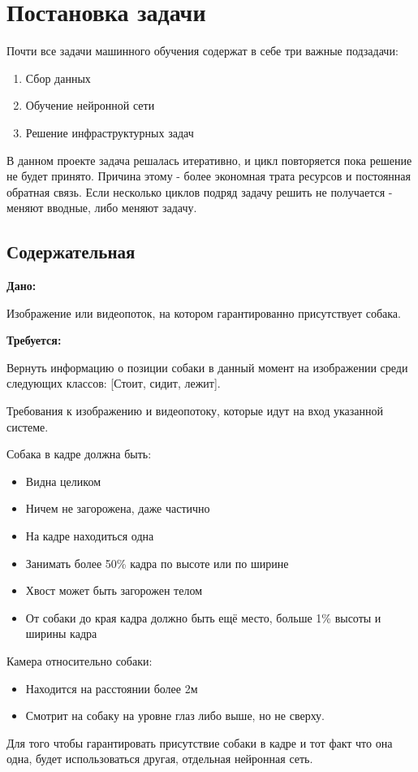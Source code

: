 \chapter{Постановка задачи} \label{chapt2}

Почти все задачи машинного обучения содержат в себе три важные подзадачи:
\begin{enumerate}
    \item Сбор данных
    \item Обучение нейронной сети
    \item Решение инфраструктурных задач
\end{enumerate}

В данном проекте задача решалась итеративно, и цикл повторяется пока решение не будет принято. Причина этому - более экономная трата ресурсов и постоянная обратная связь. Если несколько циклов подряд задачу решить не получается - меняют вводные, либо меняют задачу. 

\section{Содержательная} \label{sect2_1}
\textbf{Дано: } 

Изображение или видеопоток, на котором гарантированно присутствует собака.

\textbf{Требуется: } 

Вернуть информацию о позиции собаки в данный момент на изображении среди следующих классов: [Стоит, сидит, лежит].

Требования к изображению и видеопотоку, которые идут на вход указанной системе. 

Собака в кадре должна быть:
\begin{itemize}
    \item Видна целиком
    \item Ничем не загорожена, даже частично
    \item На кадре находиться одна
    \item Занимать более 50\% кадра по высоте или по ширине
    \item Хвост может быть загорожен телом 
    \item От собаки до края кадра должно быть ещё место, больше 1\% высоты и ширины кадра
 \end{itemize}
 
Камера относительно собаки:
\begin{itemize}
    \item Находится на расстоянии более 2м
    \item Смотрит на собаку на уровне глаз либо выше, но не сверху.
\end{itemize}

Для того чтобы гарантировать присутствие собаки в кадре и тот факт что она одна, будет использоваться другая, отдельная нейронная сеть. 
